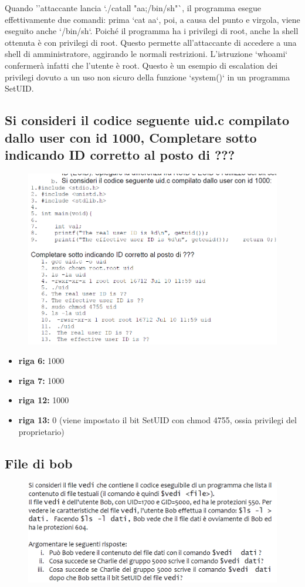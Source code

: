 \documentclass{report}
\begin{document}
Quando '’attaccante lancia `./catall "aa;/bin/sh"`, il programma esegue effettivamente due comandi: prima `cat aa`, poi, a causa del punto e virgola, viene eseguito anche `/bin/sh`. Poiché il programma ha i privilegi di root, anche la shell ottenuta è con privilegi di root. Questo permette all’attaccante di accedere a una shell di amministratore, aggirando le normali restrizioni. L'istruzione `whoami` confermerà infatti che l’utente è root. Questo è un esempio di escalation dei privilegi dovuto a un uso non sicuro della funzione `system()` in un programma SetUID.


\subsection{Si consideri il codice seguente uid.c compilato dallo user con id 1000, Completare sotto indicando ID corretto al posto di ???}
\begin{figure}[H]
    \centering
    \includegraphics[width=0.8\linewidth]{images/esedomanda.png}
\end{figure}

\begin{itemize}
    \item \textbf{riga 6:} 1000
    \item \textbf{riga 7:} 1000
    \item \textbf{riga 12:} 1000
    \item \textbf{riga 13:} 0 (viene impostato il bit SetUID con chmod 4755, ossia privilegi del proprietario)
\end{itemize}

\subsection{File di bob}
\begin{figure}[H]
    \centering
    \includegraphics[width=1\linewidth]{images/bobfile.png}
\end{figure}
\end{document}
